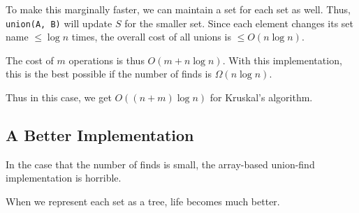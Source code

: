                     To make this marginally faster, we can maintain a set for each set as well.
                    Thus, \verb|union(A, B)| will update $S$ for the smaller set.
                    Since each element changes its set name $\le \log n$ times, the overall cost of all unions is $\le O(n \log n)$.

                    The cost of $m$ operations is thus $O(m + n \log n)$.
                    With this implementation, this is the best possible if the number of finds is $\Omega(n \log n)$.

                    Thus in this case, we get $O((n+m) \log n)$ for Kruskal's algorithm.
                \subsection{A Better Implementation} %
                \label{sub:a_better_implementation}
                    In the case that the number of finds is small, the array-based union-find implementation is horrible.

                    When we represent each set as a tree, life becomes much better.

